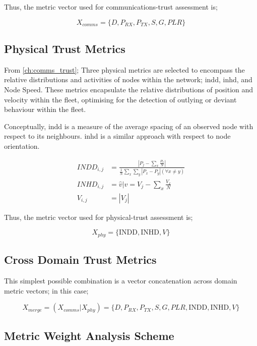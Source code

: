 Thus, the metric vector used for communications-trust assessment is;

\begin{equation}
  X_{comms}=\{D, P_{RX}, P_{TX}, S, G, PLR\}
  \label{eq:comms_vector}
\end{equation}

\subsection{Physical Trust Metrics}

From \autoref{ch:comms_trust}; Three physical metrics are selected to encompass the relative distributions and activities of nodes within the network; \gls{indd}, \gls{inhd}, and Node Speed. These metrics encapsulate the relative distributions of position and velocity within the fleet, optimising for the detection of outlying or deviant behaviour within the fleet.

Conceptually, \gls{indd} is a measure of the average spacing of an observed node with respect to its neighbours. \gls{inhd} is a similar approach with respect to node orientation.

\begin{align}
  INDD_{i,j} &= \frac{|P_j - \sum_x \frac{P_x}{N}|}{\frac{1}{N}\sum_x \sum_y{|P_x - P_y| (\forall x \neq y)}}\\
  INHD_{i,j} &= \hat{v} \vert v= V_j - \sum_x{\frac{V_x}{N}}\\
  V_{i,j} &= |V_j|
\end{align}

Thus, the metric vector used for physical-trust assessment is;

\begin{equation}
  X_{phy}=\{\text{INDD}, \text{INHD}, V\}
  \label{eq:phys:vector}
\end{equation}


\subsection{Cross Domain Trust Metrics}
This simplest possible combination is a vector concatenation across domain metric vectors; in this case; 

\begin{equation}
  X_{merge} =  (X_{comms}|X_{phy}) = \{D, P_{RX}, P_{TX}, S, G, PLR, \text{INDD}, \text{INHD}, V\}
  \label{eq:phys:vector}
\end{equation}


\subsection{Metric Weight Analysis Scheme}


